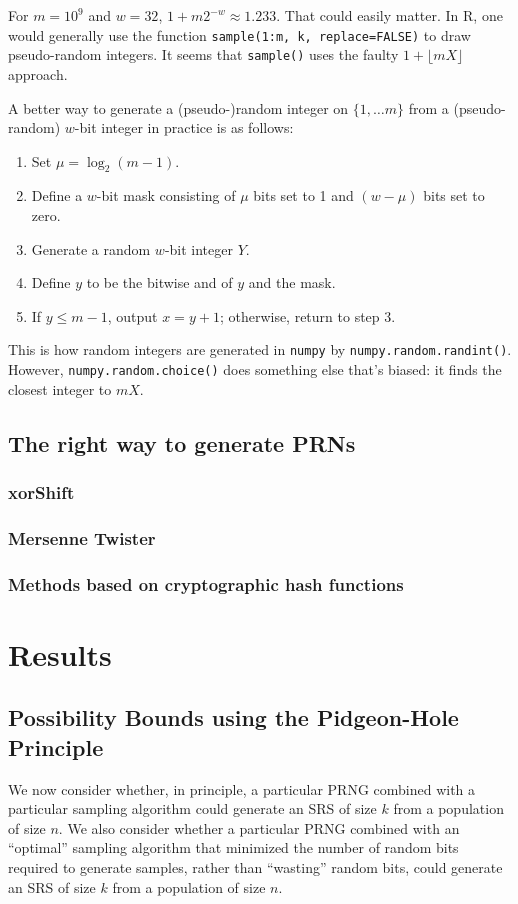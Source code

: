 \documentclass[12pt]{article}
\newcommand{\todo}[1]{{\color{red}{TO DO: \sc #1}}}
\begin{document}
For $m = 10^9$ and $w=32$, $1 + m 2^{-w} \approx 1.233$. That could easily matter.
In R, one would generally use the function \texttt{sample(1:m, k, replace=FALSE)} to draw pseudo-random integers. 
It seems that \texttt{sample()} uses the faulty $1 + \lfloor mX\rfloor$ approach.
\todo{make absolute sure that this is what R does!!}
\todo{illustrate with a figure}

A better way to generate a (pseudo-)random integer on $\{1, \ldots m\}$ from a (pseudo-random) $w$-bit integer in practice is as follows:
\begin{enumerate}
\item Set $\mu = \log_2(m-1)$.
\item Define a $w$-bit mask consisting of $\mu$ bits set to 1 and $(w-\mu)$ bits set to zero.
\item Generate a random $w$-bit integer $Y$.
\item Define $y$ to be the bitwise and of $y$ and the mask.
\item If $y \le m-1$, output $x = y+1$; otherwise, return to step 3.
\end{enumerate}
This is how random integers are generated in \texttt{numpy} by \texttt{numpy.random.randint()}. 
However, \texttt{numpy.random.choice()} does something else that's biased: it finds the closest integer to $mX$.

\subsection{The right way to generate PRNs}
\subsubsection{xorShift}
\subsubsection{Mersenne Twister}
\subsubsection{Methods based on cryptographic hash functions}

\section{Results}
\subsection{Possibility Bounds using the Pidgeon-Hole Principle}
We now consider whether, in principle, a particular PRNG combined with a particular sampling algorithm could generate an SRS of size $k$ from a population of size $n$.
We also consider whether a particular PRNG combined with an ``optimal'' sampling algorithm that minimized the number of random bits required to generate samples, rather than ``wasting'' random bits, could generate an SRS of size $k$ from a population of size $n$.
\end{document}
